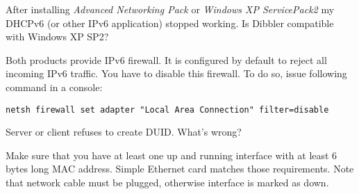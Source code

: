 \Q After installing \emph{Advanced Networking Pack} or \emph{Windows XP
  ServicePack2} my DHCPv6 (or other IPv6 application) stopped
   working. Is Dibbler compatible with Windows XP SP2?

\A Both products provide IPv6 firewall. It
is configured by default to reject all incoming IPv6 traffic. You have
to disable this firewall. To do so, issue following command in a
console:

\begin{verbatim}
netsh firewall set adapter "Local Area Connection" filter=disable
\end{verbatim}

\Q Server or client refuses to create DUID. What's wrong?

\A Make sure that you have at least one up and running interface with
at least 6 bytes long MAC address. Simple Ethernet card matches those
requirements. Note that network cable must be plugged, otherwise
interface is marked as down.
